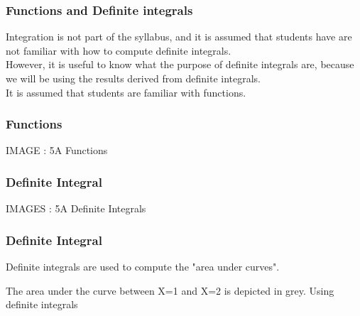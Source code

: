 

\begin{frame}
\frametitle{Functions and Definite integrals}
\large
Integration is not part of the syllabus, and it is assumed that students have are not familiar with how to compute definite integrals.\\ \bigskip
 However,  it is useful to know what the purpose of definite integrals are, because we will be using the results derived from definite integrals. \\ It is assumed that students are familiar with functions.

\end{frame}
\begin{frame}
\frametitle{Functions}

IMAGE : 5A Functions

\end{frame}
\begin{frame}
\frametitle{Definite Integral}

IMAGES : 5A Definite Integrals

\end{frame}
\begin{frame}
\frametitle{Definite Integral}

Definite integrals are used to compute the "area under curves". 

The area under the curve between X=1 and  X=2 is depicted in grey. Using definite integrals

\end{frame}
